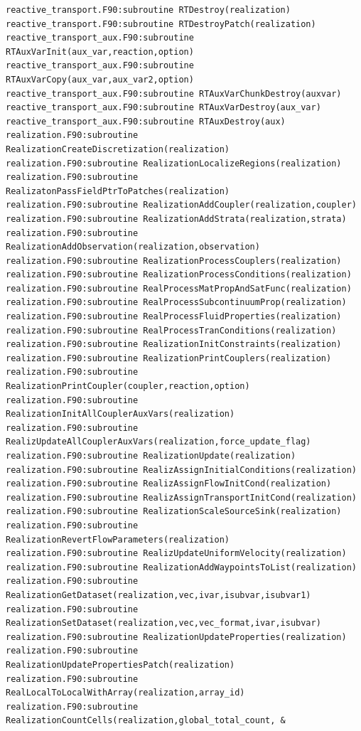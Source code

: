 \documentclass[12pt]{article}
\begin{document}
\begin{verbatim}
reactive_transport.F90:subroutine RTDestroy(realization)
reactive_transport.F90:subroutine RTDestroyPatch(realization)
reactive_transport_aux.F90:subroutine RTAuxVarInit(aux_var,reaction,option)
reactive_transport_aux.F90:subroutine RTAuxVarCopy(aux_var,aux_var2,option)
reactive_transport_aux.F90:subroutine RTAuxVarChunkDestroy(auxvar)
reactive_transport_aux.F90:subroutine RTAuxVarDestroy(aux_var)
reactive_transport_aux.F90:subroutine RTAuxDestroy(aux)
realization.F90:subroutine RealizationCreateDiscretization(realization)
realization.F90:subroutine RealizationLocalizeRegions(realization)
realization.F90:subroutine RealizatonPassFieldPtrToPatches(realization)
realization.F90:subroutine RealizationAddCoupler(realization,coupler)
realization.F90:subroutine RealizationAddStrata(realization,strata)
realization.F90:subroutine RealizationAddObservation(realization,observation)
realization.F90:subroutine RealizationProcessCouplers(realization)
realization.F90:subroutine RealizationProcessConditions(realization)
realization.F90:subroutine RealProcessMatPropAndSatFunc(realization)
realization.F90:subroutine RealProcessSubcontinuumProp(realization)
realization.F90:subroutine RealProcessFluidProperties(realization)
realization.F90:subroutine RealProcessTranConditions(realization)
realization.F90:subroutine RealizationInitConstraints(realization)
realization.F90:subroutine RealizationPrintCouplers(realization)
realization.F90:subroutine RealizationPrintCoupler(coupler,reaction,option)
realization.F90:subroutine RealizationInitAllCouplerAuxVars(realization)
realization.F90:subroutine RealizUpdateAllCouplerAuxVars(realization,force_update_flag)
realization.F90:subroutine RealizationUpdate(realization)
realization.F90:subroutine RealizAssignInitialConditions(realization)
realization.F90:subroutine RealizAssignFlowInitCond(realization)
realization.F90:subroutine RealizAssignTransportInitCond(realization)
realization.F90:subroutine RealizationScaleSourceSink(realization)
realization.F90:subroutine RealizationRevertFlowParameters(realization)
realization.F90:subroutine RealizUpdateUniformVelocity(realization)
realization.F90:subroutine RealizationAddWaypointsToList(realization)
realization.F90:subroutine RealizationGetDataset(realization,vec,ivar,isubvar,isubvar1)
realization.F90:subroutine RealizationSetDataset(realization,vec,vec_format,ivar,isubvar)
realization.F90:subroutine RealizationUpdateProperties(realization)
realization.F90:subroutine RealizationUpdatePropertiesPatch(realization)
realization.F90:subroutine RealLocalToLocalWithArray(realization,array_id)
realization.F90:subroutine RealizationCountCells(realization,global_total_count, &

\end{verbatim}
\end{document}
